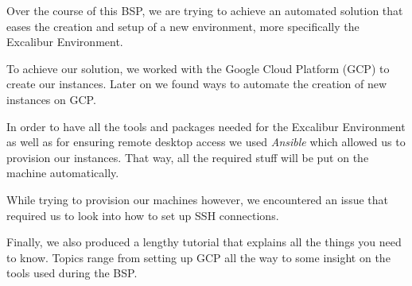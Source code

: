 %
%
%
%

Over the course of this BSP, we are trying to achieve an automated
solution that eases the creation and setup of a new environment, more
specifically the Excalibur Environment.

To achieve our solution, we worked with the Google Cloud Platform
(GCP) to create our instances. Later on we found ways to automate the
creation of new instances on GCP. 

In order to have all the tools and packages needed for the Excalibur
Environment as well as for ensuring remote desktop access we used
\textit{Ansible} which allowed us to provision our instances. That
way, all the required stuff will be put on the machine automatically.

While trying to provision our machines however, we encountered an
issue that required us to look into how to set up SSH connections.

Finally, we also produced a lengthy tutorial that explains all the
things you need to know. Topics range from setting up GCP all the way
to some insight on the tools used during the BSP.
